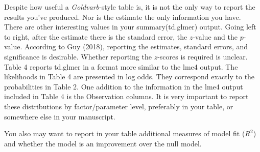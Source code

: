 \documentclass[
  10pt,
  letterpaper]{article}
\renewcommand\texttt[1]{{\ttfamily\color{BrickRed}#1}}
\begin{document}
Despite how useful a \emph{Goldvarb}-style table is, it is not the only
way to report the results you've produced. Nor is the estimate the only
information you have. There are other interesting values in your
\texttt{summary(td.glmer)} output. Going left to right, after the
estimate there is the standard error, the \(z\)-value and the
\(p\)-value. According to Guy (2018), reporting the estimates, standard
errors, and significance is desirable. Whether reporting the
\(z\)-scores is required is unclear. Table 4 reports \texttt{td.glmer}
in a format more similar to the \texttt{lme4} output. The likelihoods in
Table 4 are presented in log odds. They correspond exactly to the
probabilities in Table 2. One addition to the information in the
\texttt{lme4} output included in Table 4 is the Observation columns. It
is very important to report these distributions by factor/parameter
level, preferably in your table, or somewhere else in your manuscript.

You also may want to report in your table additional measures of model
fit (\(R^2\)) and whether the model is an improvement over the null
model.
\end{document}
